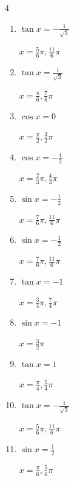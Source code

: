 \begin{multicols}{4}
\begin{enumerate}
        $\displaystyle x = \frac{\pi}{4} , \frac{7}{4}\pi$

  \item $\displaystyle \tan{x}  = -\frac{1}{\sqrt{3}}$

        $\displaystyle x = \frac{5}{6}\pi , \frac{11}{6}\pi$

  \item $\displaystyle \tan{x}  = \frac{1}{\sqrt{3}}$

        $\displaystyle x = \frac{\pi}{6} , \frac{7}{6}\pi$

  \item $\displaystyle \cos{x}  = 0$

        $\displaystyle x = \frac{\pi}{2} , \frac{3}{2}\pi$

  \item $\displaystyle \cos{x}  = -\frac{1}{2}$

        $\displaystyle x = \frac{2}{3}\pi , \frac{4}{3}\pi$

  \item $\displaystyle \sin{x}  = -\frac{1}{2}$

        $\displaystyle x = \frac{7}{6}\pi , \frac{11}{6}\pi$

  \item $\displaystyle \sin{x}  = -\frac{1}{2}$

        $\displaystyle x = \frac{7}{6}\pi , \frac{11}{6}\pi$

\columnbreak %

  \item $\displaystyle \tan{x}  = -1$

        $\displaystyle x = \frac{3}{4}\pi , \frac{7}{4}\pi$

  \item $\displaystyle \sin{x}  = -1$

        $\displaystyle x = \frac{3}{2}\pi$

  \item $\displaystyle \tan{x}  = 1$

        $\displaystyle x = \frac{\pi}{4} , \frac{5}{4}\pi$

  \item $\displaystyle \tan{x}  = -\frac{1}{\sqrt{3}}$

        $\displaystyle x = \frac{5}{6}\pi , \frac{11}{6}\pi$

  \item $\displaystyle \sin{x}  = \frac{1}{2}$

        $\displaystyle x = \frac{\pi}{6} , \frac{5}{6}\pi$


\end{enumerate}
\end{multicols}

